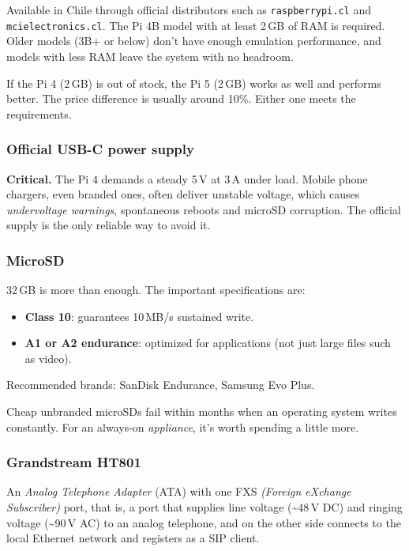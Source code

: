 Available in Chile through official distributors such as \texttt{raspberrypi.cl} and \texttt{mcielectronics.cl}. The Pi 4B model with at least 2\,GB of RAM is required. Older models (3B+ or below) don't have enough emulation performance, and models with less RAM leave the system with no headroom.

\begin{note}
If the Pi 4 (2\,GB) is out of stock, the Pi 5 (2\,GB) works as well and performs better. The price difference is usually around 10\%. Either one meets the requirements.
\end{note}

\subsubsection{Official USB-C power supply}

\textbf{Critical.} The Pi 4 demands a steady 5\,V at 3\,A under load. Mobile phone chargers, even branded ones, often deliver unstable voltage, which causes \emph{undervoltage warnings}, spontaneous reboots and microSD corruption. The official supply is the only reliable way to avoid it.

\subsubsection{MicroSD}

32\,GB is more than enough. The important specifications are:

\begin{itemize}
  \item \textbf{Class 10}: guarantees 10\,MB/s sustained write.
  \item \textbf{A1 or A2 endurance}: optimized for applications (not just large files such as video).
\end{itemize}

Recommended brands: SanDisk Endurance, Samsung Evo Plus.

\begin{tip}
Cheap unbranded microSDs fail within months when an operating system writes constantly. For an always-on \emph{appliance}, it's worth spending a little more.
\end{tip}

\subsubsection{Grandstream HT801}

An \emph{Analog Telephone Adapter} (ATA) with one FXS \emph{(Foreign eXchange Subscriber)} port, that is, a port that supplies line voltage (\textasciitilde48\,V DC) and ringing voltage (\textasciitilde90\,V AC) to an analog telephone, and on the other side connects to the local Ethernet network and registers as a SIP client.

